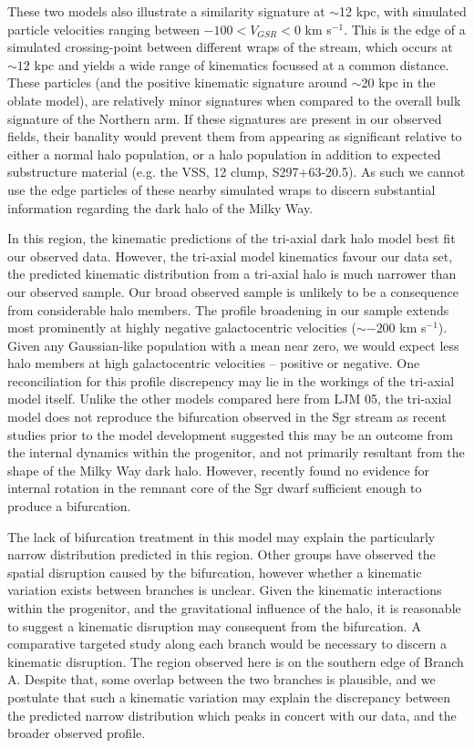 \documentclass{emulateapj}
\begin{document}
	These two models also illustrate a similarity signature at $\sim$12 kpc, with simulated particle velocities ranging between $-100 < V_{GSR} < 0$ km s$^{-1}$. This is the edge of a simulated crossing-point between different wraps of the stream, which occurs at $\sim12$ kpc and yields a wide range of kinematics focussed at a common distance. These particles (and the positive kinematic signature around $\sim$20 kpc in the oblate model), are relatively minor signatures when compared to the overall bulk signature of the Northern arm. If these signatures are present in our observed fields, their banality would prevent them from appearing as significant relative to either a normal halo population, or a halo population in addition to expected substructure material (e.g. the VSS, 12 clump, S297+63-20.5). As such we cannot use the edge particles of these nearby simulated wraps to discern substantial information regarding the dark halo of the Milky Way.

	In this region, the kinematic predictions of the tri-axial dark halo model best fit our observed data. However, the tri-axial model kinematics favour our data set, the predicted kinematic distribution from a tri-axial halo is much narrower than our observed sample. Our broad observed sample is unlikely to be a consequence from considerable halo members. The profile broadening in our sample extends most prominently at highly negative galactocentric velocities ($\sim -200$ km s$^{-1}$). Given any Gaussian-like population with a mean near zero, we would expect less halo members at high galactocentric velocities \--- positive or negative. One reconciliation for this profile discrepency may lie in the workings of the tri-axial model itself. Unlike the other models compared here from LJM 05, the tri-axial model does not reproduce the bifurcation observed in the Sgr stream \citep{Belokurov;et-al_2006} as recent studies prior to the model development suggested this may be an outcome from the internal dynamics within the progenitor, and not primarily resultant from the shape of the Milky Way dark halo\citep{Fellhauer;et-al_2006}. However, \citet{Penarrubia;et-al_2010} recently found no evidence for internal rotation in the remnant core of the Sgr dwarf sufficient enough to produce a bifurcation.


	The lack of bifurcation treatment in this model may explain the particularly narrow distribution predicted in this region. Other groups have observed the spatial disruption caused by the bifurcation, however whether a kinematic variation exists between branches is unclear. Given the kinematic interactions within the progenitor, and the gravitational influence of the halo, it is reasonable to suggest a kinematic disruption may consequent from the bifurcation. A comparative targeted study along each branch would be necessary to discern a kinematic disruption. The region observed here is on the southern edge of Branch A. Despite that, some overlap between the two branches is plausible, and we postulate that such a kinematic variation may explain the discrepancy between the predicted narrow distribution which peaks in concert with our data, and the broader observed profile. 
	
\end{document}
